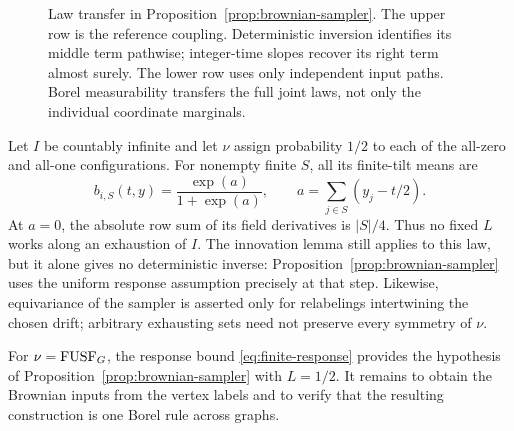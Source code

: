 \begin{figure}[htbp]
\centering
{}
\caption{Law transfer in Proposition~\ref{prop:brownian-sampler}.
The upper row is the reference coupling. Deterministic inversion identifies
its middle term pathwise; integer-time slopes recover its right term almost
surely. The lower row uses only independent input paths. Borel measurability
transfers the full joint laws, not only the individual coordinate marginals.}
\label{fig:law-transfer}
\end{figure}

\begin{remark}
Let $I$ be countably infinite and let $\nu$ assign probability $1/2$ to
each of the all-zero and all-one configurations. For nonempty finite $S$,
all its finite-tilt means are
\[
 b_{i,S}(t,y)=\frac{\exp(a)}{1+\exp(a)},
 \qquad a=\sum_{j\in S}(y_j-t/2).
\]
At $a=0$, the absolute row sum of its field derivatives is $|S|/4$.
Thus no fixed $L$ works along an exhaustion of $I$. The innovation lemma
still applies to this law, but it alone gives no deterministic inverse:
Proposition~\ref{prop:brownian-sampler} uses the uniform response assumption
precisely at that step. Likewise, equivariance of the sampler is asserted
only for relabelings intertwining the chosen drift; arbitrary exhausting
sets need not preserve every symmetry of $\nu$.
\end{remark}

For $\nu=\mathrm{FUSF}_G$, the response bound \eqref{eq:finite-response}
provides the hypothesis of Proposition~\ref{prop:brownian-sampler}
with $L=1/2$.  It remains to obtain the Brownian inputs from the vertex
labels and to verify that the resulting construction is one Borel
rule across graphs.
